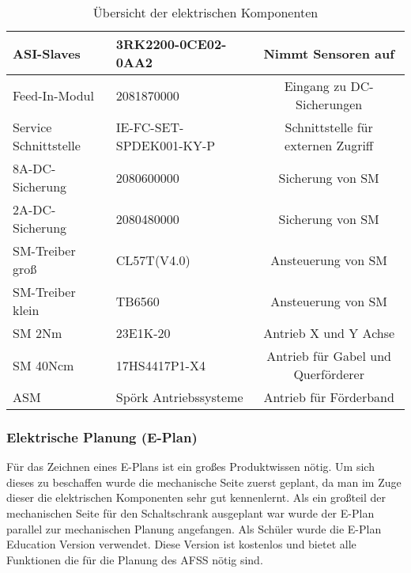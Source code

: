 \begin{table}[h!]
\begin{tabular}{|l|l|c|}
            ASI-Slaves & 3RK2200-0CE02-0AA2 & Nimmt Sensoren auf \\ \hline
            Feed-In-Modul & 2081870000 & Eingang zu DC-Sicherungen \\ \hline            
            Service Schnittstelle & IE-FC-SET-SPDEK001-KY-P & Schnittstelle für externen Zugriff \\ \hline
            8A-DC-Sicherung & 2080600000 & Sicherung von SM \\ \hline
            2A-DC-Sicherung & 2080480000 & Sicherung von SM \\ \hline
            SM-Treiber groß & CL57T(V4.0) & Ansteuerung von SM \\ \hline
            SM-Treiber klein & TB6560 & Ansteuerung von SM \\ \hline
            SM 2Nm & 23E1K-20 & Antrieb X und Y Achse \\ \hline
            SM 40Ncm & 17HS4417P1-X4 & Antrieb für Gabel und Querförderer \\ \hline
            ASM & Spörk Antriebssysteme & Antrieb für Förderband \\ \hline
        \end{tabular}
        \caption{Übersicht der elektrischen Komponenten}
        \label{tab:elektrische_komponenten}
    \end{table}
\subsubsection{Elektrische Planung (E-Plan)}
\label{sec:Elektrische Planung}
    Für das Zeichnen eines E-Plans ist ein großes Produktwissen nötig. Um sich dieses zu beschaffen wurde die mechanische Seite zuerst geplant, da man im  Zuge dieser die elektrischen Komponenten sehr gut kennenlernt. Als ein großteil der mechanischen Seite für den Schaltschrank ausgeplant war wurde der E-Plan parallel zur mechanischen Planung angefangen. Als Schüler wurde die E-Plan Education Version verwendet. Diese Version ist kostenlos und bietet alle Funktionen die für die Planung des AFSS nötig sind.

